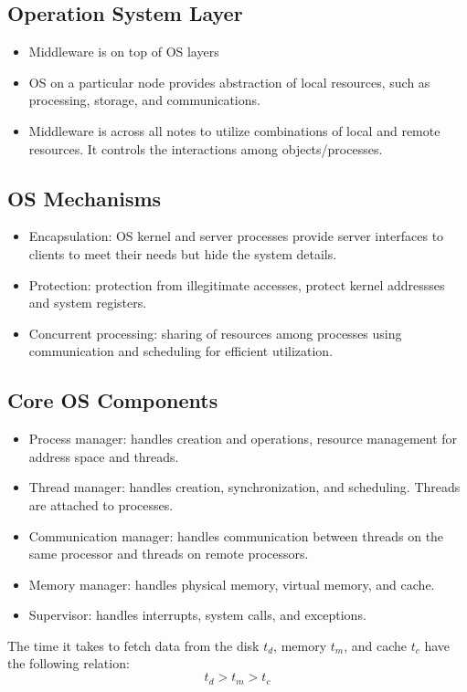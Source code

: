 \documentclass[letterpaper, 12pt]{math}
\begin{document}
\subsection*{Operation System Layer}
\begin{itemize}
  \item Middleware is on top of OS layers
  \item OS on a particular node provides abstraction of local resources, such
  as processing, storage, and communications.
  \item Middleware is across all notes to utilize combinations of local and
  remote resources. It controls the interactions among objects/processes.
\end{itemize}

\subsection*{OS Mechanisms}
\begin{itemize}
  \item Encapsulation: OS kernel and server processes provide server interfaces
  to clients to meet their needs but hide the system details.
  \item Protection: protection from illegitimate accesses, protect kernel
  addressses and system registers.
  \item Concurrent processing: sharing of resources among processes using
  communication and scheduling for efficient utilization.
\end{itemize}

\subsection*{Core OS Components}
\begin{itemize}
  \item Process manager: handles creation and operations, resource management
  for address space and threads.
  \item Thread manager: handles creation, synchronization, and scheduling.
  Threads are attached to processes.
  \item Communication manager: handles communication between threads on the same
  processor and threads on remote processors.
  \item Memory manager: handles physical memory, virtual memory, and cache.
  \item Supervisor: handles interrupts, system calls, and exceptions.
\end{itemize}
The time it takes to fetch data from the disk \( t_d \), memory \( t_m \), and
cache \( t_c \) have the following relation:
\[ t_d > t_m > t_c \]
\end{document}
